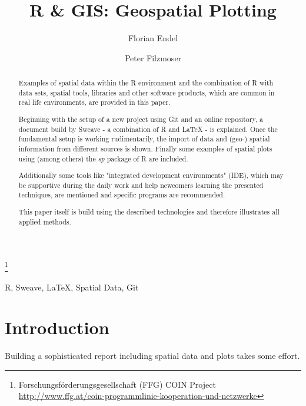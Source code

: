 \documentclass{ifacconf}
\begin{document}
\begin{frontmatter}

\title{R \& GIS: Geospatial Plotting} 

\thanks[footnoteinfo]{Forschungsförderungsgesellschaft (FFG) COIN Project
\url{http://www.ffg.at/coin-programmlinie-kooperation-und-netzwerke}}

\author[First]{Florian Endel} 
\author[Second]{Peter Filzmoser} 

\address[First]{FFG IFEDH project, Student at Vienna University of Technology (e-mail: florian@endel.at).}
\address[Second]{Department of Statistics and Probability Theory,
Vienna University of Technology (e-mail: P.Filzmoser@tuwien.ac.at)}

\begin{abstract}                %
Examples of spatial data within the R environment and the 
combination of R with data sets, spatial
tools, libraries and other software products, which are common 
in real life environments, are provided in this paper.

Beginning with the setup of a new project using Git 
and an online repository, a document build by Sweave - a
combination of R and \LaTeX{} - is explained. Once the 
fundamental setup is working rudimentarily, the import
of data and (geo-) spatial information from different 
sources is shown. Finally some examples of spatial plots
using (among others) the \textit{sp} package of R are included.

Additionally some tools like "integrated development environments" (IDE), 
which may be supportive during the daily work
and help newcomers learning the presented techniques, 
are mentioned and specific programs are recommended.

This paper itself is build using the described technologies and therefore illustrates 
all applied methods. 
\end{abstract}

\begin{keyword}
R, Sweave, \LaTeX{}, Spatial Data, Git
\end{keyword}

\end{frontmatter}

\section{Introduction}
Building a sophisticated report including spatial data and plots takes some effort.
\end{document}
